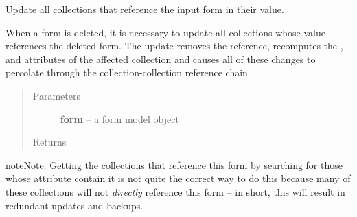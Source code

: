 \documentclass[letterpaper,10pt,english]{sphinxmanual}
\begin{document}

\begin{fulllineitems}
\label{api:onlinelinguisticdatabase.controllers.forms.updateCollectionsReferencingThisForm}
Update all collections that reference the input form in their  value.

When a form is deleted, it is necessary to update all collections whose
 value references the deleted form.  The update removes the
reference, recomputes the ,  and 
attributes of the affected collection and causes all of these changes to
percolate through the collection-collection reference chain.
\begin{quote}\begin{description}
\item[{Parameters}] \leavevmode
\textbf{form} -- a form model object

\item[{Returns}] \leavevmode
{}

\end{description}\end{quote}

\begin{notice}{note}{Note:}
Getting the collections that reference this form by searching for those
whose  attribute contain it is not quite the correct way to do
this because many of these collections will not \emph{directly} reference this
form -- in short, this will result in redundant updates and backups.
\end{notice}

\end{fulllineitems}

\end{document}
